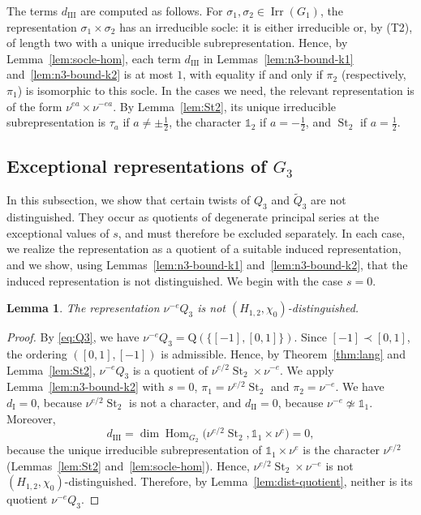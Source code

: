 \documentclass[11pt]{amsart}
\numberwithin{equation}{section}
\theoremstyle{plain}
\newtheorem{lemma}[theorem]{Lemma}
\theoremstyle{definition}
\theoremstyle{remark}
\newcommand{\one}{\mathds{1}}
\DeclareMathOperator{\Hom}{Hom}
\DeclareMathOperator{\Irr}{Irr}
\DeclareMathOperator{\St}{St}
\newcommand{\Qt}{\widetilde{Q}}
\newcommand{\Qq}{\mathrm{Q}}
\newcommand{\dI}{d_{\mathrm{I}}}
\newcommand{\dII}{d_{\mathrm{II}}}
\newcommand{\dIII}{d_{\mathrm{III}}}
\begin{document}
The terms $\dIII$ are computed as follows. For $\sigma_1,\sigma_2\in\Irr(G_1)$, the representation $\sigma_1\times\sigma_2$ has an irreducible socle: it is either irreducible or, by (T2), of length two with a unique irreducible subrepresentation. Hence, by Lemma~\ref{lem:socle-hom}, each term $\dIII$ in Lemmas~\ref{lem:n3-bound-k1} and~\ref{lem:n3-bound-k2} is at most $1$, with equality if and only if $\pi_2$ (respectively, $\pi_1$) is isomorphic to this socle. In the cases we need, the relevant representation is of the form $\nu^{ea}\times\nu^{-ea}$. By Lemma~\ref{lem:St2}, its unique irreducible subrepresentation is $\tau_a$ if $a\ne\pm\frac12$, the character $\one_2$ if $a=-\frac12$, and $\St_2$ if $a=\frac12$.

\subsection{Exceptional representations of \texorpdfstring{$G_3$}{G3}}\label{ss:n3-exceptional}

In this subsection, we show that certain twists of $Q_3$ and $\Qt_3$ are not distinguished. They occur as quotients of degenerate principal series at the exceptional values of $s$, and must therefore be excluded separately. In each case, we realize the representation as a quotient of a suitable induced representation, and we show, using Lemmas~\ref{lem:n3-bound-k1} and~\ref{lem:n3-bound-k2}, that the induced representation is not distinguished. We begin with the case $s=0$.

\begin{lemma}\label{lem:n3-Q3-s0}
	The representation $\nu^{-e}Q_3$ is not $(H_{1,2},\chi_0)$-distinguished.
\end{lemma}

\begin{proof}
	By \eqref{eq:Q3}, we have $\nu^{-e}Q_3=\Qq(\{[-1],[0,1]\})$. Since $[-1]\prec[0,1]$, the ordering $([0,1],[-1])$ is admissible. Hence, by Theorem~\ref{thm:lang} and Lemma~\ref{lem:St2}, $\nu^{-e}Q_3$ is a quotient of $\nu^{e/2}\St_2\times\nu^{-e}$. We apply Lemma~\ref{lem:n3-bound-k2} with $s=0$, $\pi_1=\nu^{e/2}\St_2$ and $\pi_2=\nu^{-e}$. We have $\dI=0$, because $\nu^{e/2}\St_2$ is not a character, and $\dII=0$, because $\nu^{-e}\not\simeq\one_1$. Moreover,
	$$
	\dIII=\dim\Hom_{G_2}\big(\nu^{e/2}\St_2,\one_1\times\nu^{e}\big)=0,$$
	because the unique irreducible subrepresentation of $\one_1\times\nu^e$ is the character $\nu^{e/2}$ (Lemmas~\ref{lem:St2} and~\ref{lem:socle-hom}). Hence, $\nu^{e/2}\St_2\times\nu^{-e}$ is not $(H_{1,2},\chi_0)$-distinguished. Therefore, by Lemma~\ref{lem:dist-quotient}, neither is its quotient $\nu^{-e}Q_3$.
\end{proof}
\end{document}
